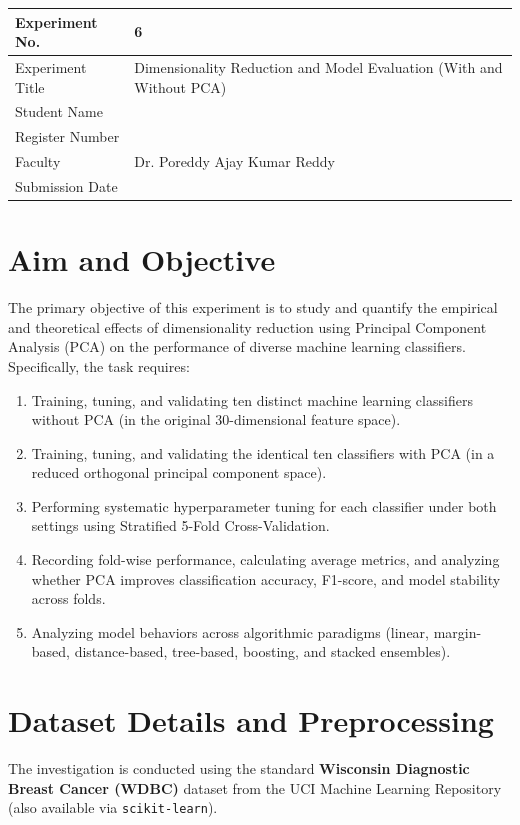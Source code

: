 \documentclass[12pt,a4paper]{article}
\begin{document}
\begin{tabular}{|p{4cm}|p{11.5cm}|}
\hline
Experiment No. & 6 \\ \hline
Experiment Title & Dimensionality Reduction and Model Evaluation (With and Without PCA) \\ \hline
Student Name & \\ \hline
Register Number & \\ \hline
Faculty & Dr. Poreddy Ajay Kumar Reddy \\ \hline
Submission Date & \\ \hline
\end{tabular}

\vspace{0.5cm}

\section{Aim and Objective}
The primary objective of this experiment is to study and quantify the empirical and theoretical effects of dimensionality reduction using Principal Component Analysis (PCA) on the performance of diverse machine learning classifiers. Specifically, the task requires:
\begin{enumerate}[label=\alph*)]
\item Training, tuning, and validating ten distinct machine learning classifiers without PCA (in the original 30-dimensional feature space).
\item Training, tuning, and validating the identical ten classifiers with PCA (in a reduced orthogonal principal component space).
\item Performing systematic hyperparameter tuning for each classifier under both settings using Stratified 5-Fold Cross-Validation.
\item Recording fold-wise performance, calculating average metrics, and analyzing whether PCA improves classification accuracy, F1-score, and model stability across folds.
\item Analyzing model behaviors across algorithmic paradigms (linear, margin-based, distance-based, tree-based, boosting, and stacked ensembles).
\end{enumerate}

\section{Dataset Details and Preprocessing}
The investigation is conducted using the standard \textbf{Wisconsin Diagnostic Breast Cancer (WDBC)} dataset from the UCI Machine Learning Repository (also available via \texttt{scikit-learn}).
\end{document}
